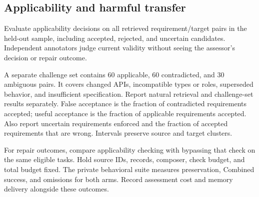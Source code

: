 \subsection{Applicability and harmful transfer}
\label{sec:applicability-audit}
Evaluate applicability decisions on all retrieved requirement/target pairs
in the held-out sample, including accepted, rejected, and uncertain candidates.
Independent annotators judge current validity without seeing the assessor's
decision or repair outcome.

A separate challenge set contains 60 applicable, 60 contradicted, and 30
ambiguous pairs. It covers changed APIs, incompatible types or roles,
superseded behavior, and insufficient specification. Report natural retrieval
and challenge-set results separately. False acceptance is the fraction of
contradicted requirements accepted; useful acceptance is the fraction of
applicable requirements accepted. Also report uncertain requirements enforced
and the fraction of accepted requirements that are wrong. Intervals preserve
source and target clusters.

For repair outcomes, compare applicability checking with bypassing that check
on the same eligible tasks. Hold source IDs, records, composer, check budget,
and total budget fixed. The private behavioral suite measures preservation,
Combined success, and omissions for both arms. Record assessment cost and
memory delivery alongside these outcomes.

